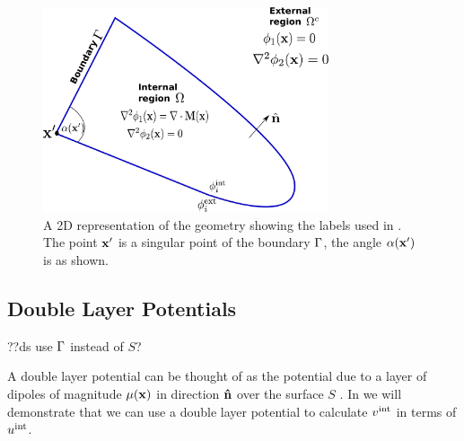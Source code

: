 \begin{figure}
  \center
  \includegraphics[width=0.75\textwidth]{./images/BEM-geometry}




  \caption{A 2D representation of the geometry showing the labels used in .
The point $\boldsymbol{\mathrm{x}}'$ is a singular point of the boundary ${\Gamma}$, the angle $\alpha(\boldsymbol{\mathrm{x}}')$ is as shown.}
  \label{fig:BEM-geometry}
\end{figure}

\subsection{Double Layer Potentials}
\label{sec:double-layer-potent}
??ds use ${\Gamma}$ instead of $S$?

A double layer potential can be thought of as the potential due to a layer of dipoles of magnitude $\mu(\boldsymbol{\mathrm{x}})$ in direction $\boldsymbol{\mathrm{\hat{n}}}$ over the surface $S$ \cite{Sternberg1946}.
In  we will demonstrate that we can use a double layer potential to calculate $v^{\mathrm{int}}$ in terms of $u^{\mathrm{int}}$.

